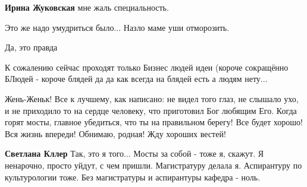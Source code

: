 \begin{itemize}
\begin{itemize}
\textbf{Ирина Жуковская} мне жаль специальность.

 
Это же надо умудриться было... Назло маме уши отморозить.

 
Да, это правда
\end{itemize}

 

К сожалению сейчас проходят только Бизнес людей идеи (короче сокращённо БЛюдей
- короче блядей да да как всегда на блядей есть а людям нету...


 

Жень-Женьк! Все к лучшему, как написано: не видел того глаз, не слышало ухо, и
не приходило то на сердце человеку, что приготовил Бог любящим Его. Когда горят
мосты, главное убедиться, что ты на правильном берегу! Все будет хорошо! Вся
жизнь впереди! Обнимаю, родная! Жду хороших вестей!


\begin{itemize}
 
\textbf{Светлана Кллер} Так, это я того... Мосты за собой - тоже я, скажут. Я ненарочно, просто уйдут, с чем пришли. Магистратуру делала я. Аспирантуру по культурологии тоже. Без магистратуры и аспирантуры кафедра - ноль.

 

\end{itemize}
\end{itemize}
